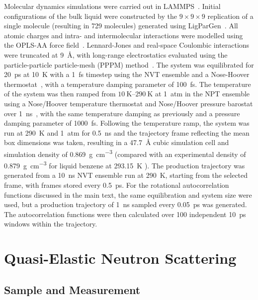 \documentclass[reprint,
               superscriptaddress,
               nobibnotes,
               amsmath,
               amssymb,
               aps,
               hidelinks, 
               pre]{revtex4-2}
\begin{document}
Molecular dynamics simulations were carried out in LAMMPS~\cite{Thompson2022}. 
Initial configurations of the bulk liquid were constructed by the $9\times 9\times 9$ replication of a single molecule (resulting in \num{729} molecules) generated using LigParGen~\cite{Dodda2017}. 
All atomic charges and intra- and intermolecular interactions were modelled using the OPLS-AA force field~\cite{Jorgensen1996}. 
Lennard-Jones and real-space Coulombic interactions were truncated at \qty{9}{\angstrom}, with long-range electrostatics evaluated using the particle-particle particle-mesh (PPPM) method~\cite{Eastwood1984}.
The system was equilibrated for \qty{20}{\pico\second} at \qty{10}{\kelvin} with a \qty{1}{\femto\second} timestep using the NVT ensemble and a Nose-Hoover thermostat~\cite{Nos1984, Hoover1985, Martyna1992}, with a temperature damping parameter of \qty{100}{\femto\second}. 
The temperature of the system was then ramped from $\qtyrange{10}{290}{\kelvin}$ at \qty{1}{atm} in the NPT ensemble using a Nose/Hoover temperature thermostat and Nose/Hoover pressure barostat over \qty{1}{\nano\second}~\cite{Martyna1994}, with the same temperature damping as previously and a pressure damping parameter of \qty{1000}{\femto\second}. 
Following the temperature ramp, the system was run at \qty{290}{\kelvin} and \qty{1}{atm} for \qty{0.5}{\nano\second} and the trajectory frame reflecting the mean box dimensions was taken, resulting in a \qty{47.7}{\angstrom} cubic simulation cell and simulation density of \qty{0.869}{\gram\per\cubic\centi\metre} (compared with an experimental density of \qty{0.879}{\gram\per\cubic\centi\metre} for liquid benzene at \qty{293.15}{\kelvin} \cite{Malek2012}).
The production trajectory was generated from a \qty{10}{\nano\second} NVT ensemble run at \qty{290}{\kelvin}, starting from the selected frame, with frames stored every \qty{0.5}{\pico\second}. 
For the rotational autocorrelation functions discussed in the main text, the same equilibration and system size were used, but a production trajectory of \qty{1}{\nano\second} sampled every \qty{0.05}{\pico\second} was generated. 
The autocorrelation functions were then calculated over 100 independent \qty{10}{\pico\second} windows within the trajectory.

\section{Quasi-Elastic Neutron Scattering}
\label{sec:qens}

\subsection{Sample and Measurement}
\end{document}
